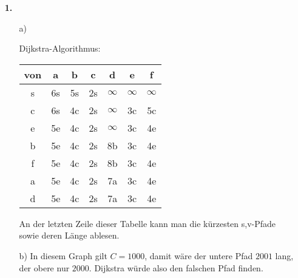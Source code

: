 \documentclass[a4paper,11pt]{article}
\author{\authorinfo}
\title{\titleinfo}
\date{\today}
\begin{document}
\maketitle
\begin{enumerate}
\item[\textbf{1.}]
    \begin{enumerate}
    \item[a)]
    \begin{multicols}{2}
        Dijkstra-Algorithmus:

        \begin{tabular}{c|cccccc}
            von & a & b & c & d & e & f \\ \hline
            s & 6s & 5s & 2s & $\infty$ & $\infty$ & $\infty$ \\
            c & 6s & 4c & 2s & $\infty$ & 3c & 5c \\
            e & 5e & 4c & 2s & $\infty$ & 3c & 4e \\
            b & 5e & 4c & 2s & 8b & 3c & 4e \\
            f & 5e & 4c & 2s & 8b & 3c & 4e \\
            a & 5e & 4c & 2s & 7a & 3c & 4e \\
            d & 5e & 4c & 2s & 7a & 3c & 4e \\
        \end{tabular}

        An der letzten Zeile dieser Tabelle kann man die kürzesten s,v-Pfade
        sowie deren Länge ablesen.

    \end{multicols}

    \item[b)]
        In diesem Graph gilt $C=1000$, damit wäre der untere Pfad $2001$ lang,
        der obere nur $2000$. Dijkstra würde also den falschen Pfad finden.


\end{enumerate}
\end{enumerate}
\end{document}
